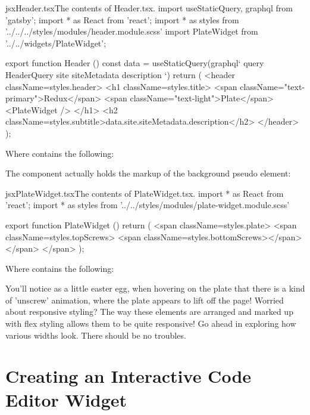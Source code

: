 \documentclass[paper=6in:9in,pagesize=pdftex,headinclude=on,footinclude=on,12pt]{scrbook}
\begin{document}
\begin{codeInput}{jsx}{Header.tsx}{The contents of Header.tsx.}
import { useStaticQuery, graphql } from 'gatsby';
import * as React from 'react';
import * as styles from '../../../styles/modules/header.module.scss'
import { PlateWidget } from '../../widgets/PlateWidget';

export function Header () {
  const data = useStaticQuery(graphql`
    query HeaderQuery {
      site {
        siteMetadata {
          description
        }
      }
    }
  `)
  return (
    <header className={styles.header}>
    <h1 className={styles.title}>
      <span className="text-primary">Redux</span>
      <span className="text-light">Plate</span>
      <PlateWidget />
    </h1>
    <h2 className={styles.subtitle}>{data.site.siteMetadata.description}</h2>
  </header>
  );
}  
\end{codeInput}

Where  contains the following:


The  component actually holds the markup of the background pseudo element:

\begin{codeInput}{jsx}{PlateWidget.tsx}{The contents of PlateWidget.tsx.}
import * as React from 'react';
import * as styles from '../../styles/modules/plate-widget.module.scss'

export function PlateWidget () {
  return (
    <span className={styles.plate}>
      <span className={styles.topScrews}>
        <span className={styles.bottomScrews}></span>
      </span>
    </span>
  );
}  
\end{codeInput}

Where  contains the following:


You'll notice as a little easter egg, when hovering on the plate that there is a kind of 'unscrew' animation, where the plate appears to lift off the page! Worried about responsive styling? The way these elements are arranged and marked up with flex styling allows them to be quite responsive! Go ahead in exploring how various widths look. There should be no troubles.

\section{Creating an Interactive Code Editor Widget}
\end{document}
